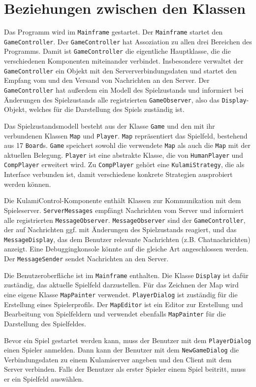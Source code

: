 \documentclass{scrartcl}
\begin{document}
\section{Beziehungen zwischen den Klassen}
\label{sec:Beziehungen}

Das Programm wird im \texttt{Mainframe} gestartet.  Der \texttt{Mainframe} startet den \texttt{GameController}.  Der \texttt{GameController} hat Assoziation zu allen drei Bereichen des Programms.  Damit ist \texttt{GameController} die eigentliche Hauptklasse, die die verschiedenen Komponenten miteinander verbindet.  Insbesondere verwaltet der \texttt{GameController} ein Objekt mit den Serververbindungsdaten und startet den Empfang vom und den Versand von Nachrichten an den Server.  Der \texttt{GameController} hat außerdem ein Modell des Spielzustands und informiert bei Änderungen des Spielzustands alle registrierten \texttt{GameObserver}, also das \texttt{Display}-Objekt, welches für die Darstellung des Spiels zuständig ist.

Das Spielzustandsmodell besteht aus der Klasse \texttt{Game} und den mit ihr verbundenen Klassen \texttt{Map} und \texttt{Player}.  \texttt{Map} repräsentiert das Spielfeld, bestehend aus 17 \texttt{Board}s.  \texttt{Game} speichert sowohl die verwendete \texttt{Map} als auch die \texttt{Map} mit der aktuellen Belegung.  \texttt{Player} ist eine abstrakte Klasse, die von \texttt{HumanPlayer} und \texttt{CompPlayer} erweitert wird.  Zu \texttt{CompPlayer} gehört eine \texttt{KulamiStrategy}, die als Interface verbunden ist, damit verschiedene konkrete Strategien ausprobiert werden können.

Die KulamiControl-Komponente enthält Klassen zur Kommunikation mit dem Spieleserver.  \texttt{ServerMessages} empfängt Nachrichten vom Server und informiert alle registrierten \texttt{MessageObserver}.  \texttt{MessageObserver} sind der \texttt{GameController}, der auf Nachrichten ggf. mit Änderungen des Spielzustands reagiert, und das \texttt{MessageDisplay}, das dem Benutzer relevante Nachrichten (z.B. Chatnachrichten)  anzeigt.  Eine Debuggingkonsole könnte auf die gleiche Art angeschlossen werden.  Der \texttt{MessageSender} sendet Nachrichten an den Server.

Die Benutzeroberfläche ist im \texttt{Mainframe} enthalten.  Die Klasse \texttt{Display} ist dafür zuständig, das aktuelle Spielfeld darzustellen.  Für das Zeichnen der Map wird eine eigene Klasse \texttt{MapPainter} verwendet.  \texttt{PlayerDialog}  ist zuständig für die Erstellung eines Spielerprofils.  Der \texttt{MapEditor} ist ein Editor zur Erstellung und Bearbeitung von Spielfeldern und verwendet ebenfalls \texttt{MapPainter} für die Darstellung des Spielfeldes.

Bevor ein Spiel gestartet werden kann, muss der Benutzer mit dem \texttt{PlayerDialog} einen Spieler anmelden.  Dann kann der Benutzer mit dem \texttt{NewGameDialog} die Verbindungsdaten zu einem Kulamiserver angeben und den Client mit dem Server verbinden.  Falls der Benutzer als erster Spieler einem Spiel beitritt, muss er ein Spielfeld auswählen.
\end{document}
